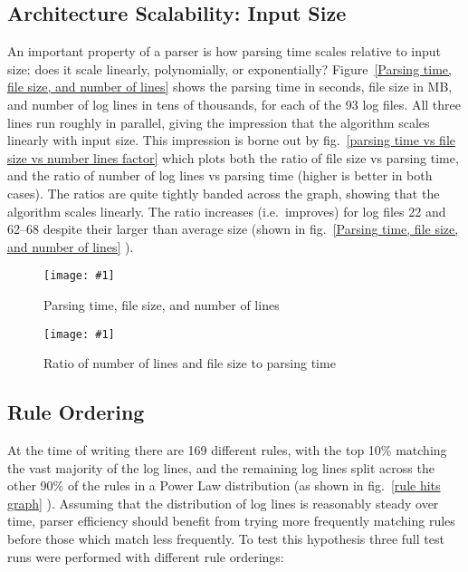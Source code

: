 \documentclass[draft]{svmult}
\newcommand{\showgraph}[3]{%
    \begin{figure}[hbtp]%
        \caption{#2}\label{#3}%
        \texttt{[image: \#1]}%
    \end{figure}%
}
\newcommand{\refwithlabel}[2]{%
    #1~\vref{#2}%
}
\newcommand{\graphref}[1]{%
    \refwithlabel{fig.}{#1}%
}
\newcommand{\Graphref}[1]{%
    \refwithlabel{Figure}{#1}%
}
\newcommand{\numberOFlogFILES}[0]{%
    93%
}
\newcommand{\numberOFrules}[0]{%
    169%
}
\begin{document}
\subsection{Architecture Scalability: Input Size}

An important property of a parser is how parsing time scales relative to
input size: does it scale linearly, polynomially, or exponentially?
\Graphref{Parsing time, file size, and number of lines} shows the parsing
time in seconds, file size in MB, and number of log lines in tens of
thousands, for each of the \numberOFlogFILES{} log files.  All three lines
run roughly in parallel, giving the impression that the algorithm scales
linearly with input size.  This impression is borne out by
\graphref{parsing time vs file size vs number lines factor} which plots
both the ratio of file size vs parsing time, and the ratio of number of log
lines vs parsing time (higher is better in both cases).  The ratios are
quite tightly banded across the graph, showing that the algorithm scales
linearly.  The ratio increases (i.e.\ improves) for log files 22 and 62--68
despite their larger than average size (shown in \graphref{Parsing time,
file size, and number of lines}).

\showgraph{build/graph-input-size-vs-parsing-time}{Parsing time, file size,
and number of lines}{Parsing time, file size, and number of lines}
\showgraph{build/graph-input-size-vs-parsing-time-ratio}{Ratio of number of
lines and file size to parsing time}{parsing time vs file size vs number
lines factor}

\subsection{Rule Ordering}

\label{Rule ordering}
\label{rule ordering for efficiency}
\label{rule efficiency}

At the time of writing there are \numberOFrules{} different rules, with the
top 10\% matching the vast majority of the log lines, and the remaining log
lines split across the other 90\% of the rules in a Power Law distribution
(as shown in \graphref{rule hits graph}).  Assuming that the distribution
of log lines is reasonably steady over time, parser efficiency should
benefit from trying more frequently matching rules before those which match
less frequently.  To test this hypothesis three full test runs were
performed with different rule orderings:
\end{document}

